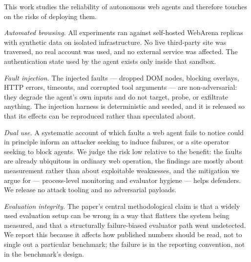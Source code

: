 This work studies the reliability of autonomous web agents and therefore touches
on the risks of deploying them.

\emph{Automated browsing.} All experiments ran against self-hosted WebArena
replicas with synthetic data on isolated infrastructure. No live third-party site
was traversed, no real account was used, and no external service was affected.
The authentication state used by the agent exists only inside that sandbox.

\emph{Fault injection.} The injected faults --- dropped DOM nodes, blocking
overlays, HTTP errors, timeouts, and corrupted tool arguments --- are
non-adversarial: they degrade the agent's own inputs and do not target, probe, or
exfiltrate anything. The injection harness is deterministic and seeded, and it is
released so that its effects can be reproduced rather than speculated about.

\emph{Dual use.} A systematic account of which faults a web agent fails to notice
could in principle inform an attacker seeking to induce failures, or a site
operator seeking to block agents. We judge the risk low relative to the benefit:
the faults are already ubiquitous in ordinary web operation, the findings are
mostly about measurement rather than about exploitable weaknesses, and the
mitigation we argue for --- process-level monitoring and evaluator hygiene ---
helps defenders. We release no attack tooling and no adversarial payloads.

\emph{Evaluation integrity.} The paper's central methodological claim is that a
widely used evaluation setup can be wrong in a way that flatters the system being
measured, and that a structurally failure-biased evaluator path went undetected.
We report this because it affects how published numbers should be read, not to
single out a particular benchmark; the failure is in the reporting convention, not
in the benchmark's design.
